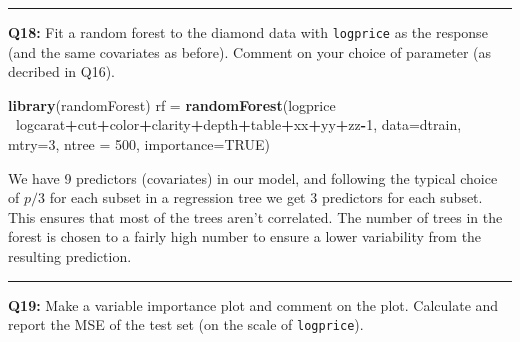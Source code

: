 \documentclass[]{article}
\newenvironment{Shaded}{\begin{snugshade}}{\end{snugshade}}
\newcommand{\KeywordTok}[1]{\textcolor[rgb]{0.13,0.29,0.53}{\textbf{#1}}}
\newcommand{\DataTypeTok}[1]{\textcolor[rgb]{0.13,0.29,0.53}{#1}}
\newcommand{\DecValTok}[1]{\textcolor[rgb]{0.00,0.00,0.81}{#1}}
\newcommand{\StringTok}[1]{\textcolor[rgb]{0.31,0.60,0.02}{#1}}
\newcommand{\OtherTok}[1]{\textcolor[rgb]{0.56,0.35,0.01}{#1}}
\newcommand{\OperatorTok}[1]{\textcolor[rgb]{0.81,0.36,0.00}{\textbf{#1}}}
\newcommand{\NormalTok}[1]{#1}
\begin{document}
\begin{center}\rule{0.5\linewidth}{\linethickness}\end{center}

\textbf{Q18:} Fit a random forest to the diamond data with
\texttt{logprice} as the response (and the same covariates as before).
Comment on your choice of parameter (as decribed in Q16).

\begin{Shaded}
\begin{Highlighting}[]
\KeywordTok{library}\NormalTok{(randomForest)}
\NormalTok{rf =}\StringTok{ }\KeywordTok{randomForest}\NormalTok{(logprice }\OperatorTok{~}\NormalTok{logcarat}\OperatorTok{+}\NormalTok{cut}\OperatorTok{+}\NormalTok{color}\OperatorTok{+}\NormalTok{clarity}\OperatorTok{+}\NormalTok{depth}\OperatorTok{+}\NormalTok{table}\OperatorTok{+}\NormalTok{xx}\OperatorTok{+}\NormalTok{yy}\OperatorTok{+}\NormalTok{zz}\OperatorTok{-}\DecValTok{1}\NormalTok{, }\DataTypeTok{data=}\NormalTok{dtrain, }\DataTypeTok{mtry=}\DecValTok{3}\NormalTok{, }\DataTypeTok{ntree =} \DecValTok{500}\NormalTok{, }\DataTypeTok{importance=}\OtherTok{TRUE}\NormalTok{)}
\end{Highlighting}
\end{Shaded}

We have 9 predictors (covariates) in our model, and following the
typical choice of \(p/3\) for each subset in a regression tree we get 3
predictors for each subset. This ensures that most of the trees aren't
correlated. The number of trees in the forest is chosen to a fairly high
number to ensure a lower variability from the resulting prediction.

\begin{center}\rule{0.5\linewidth}{\linethickness}\end{center}

\textbf{Q19:} Make a variable importance plot and comment on the plot.
Calculate and report the MSE of the test set (on the scale of
\texttt{logprice}).

\begin{Shaded}
\end{Shaded}
\end{document}
